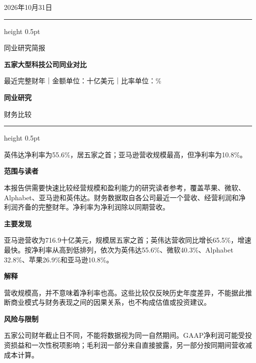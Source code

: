 \documentclass[a4paper,10pt]{article}
\newcommand{\ReportTitle}{五家大型科技公司同业对比}
\newcommand{\ReportType}{同业研究简报}
\newcommand{\ReportDate}{2026年10月31日}
\newcommand{\ReportScope}{最近完整财年｜金额单位：十亿美元｜比率单位：\%}
\newcommand{\TeamName}{同业研究}
\newcommand{\DeskName}{财务比较}
\newcommand{\KeyFinding}{英伟达净利率为55.6\%，居五家之首；亚马逊营收规模最高，但净利率为10.8\%。}
\begin{document}
\begin{minipage}[t]{0.70\textwidth}
\vspace{0pt}
{\small\ReportDate}\par\medskip
{\color{MemoBlue}\hrule height 0.5pt}\smallskip
{\large\ReportType}\par
{\LARGE\bfseries\ReportTitle}\par\medskip
\ReportScope
\end{minipage}\hfill
\begin{minipage}[t]{0.23\textwidth}
\vspace{0pt}\raggedleft
\colorbox{MemoBlue}{\parbox[c][19mm][c]{0.86\linewidth}{\centering\color{white}\bfseries\TeamName}}\par\medskip
\DeskName
\end{minipage}
\par\bigskip
{\color{MemoBlue}\hrule height 0.5pt}\medskip
{\large\KeyFinding}\par\bigskip

\begin{minipage}[t]{0.58\textwidth}
\vspace{0pt}\raggedright
\setlength{\parskip}{4pt}
\textbf{范围与读者}\par
本报告供需要快速比较经营规模和盈利能力的研究读者参考，覆盖苹果、微软、Alphabet、亚马逊和英伟达。财务数据取自各公司最近一个营收、经营利润和净利润齐备的完整财年。净利率为净利润除以同期营收。

\textbf{主要发现}\par
亚马逊营收为716.9十亿美元，规模居五家之首；英伟达营收同比增长65.5\%，增速最快。按净利率从高到低排列，依次为英伟达55.6\%、微软40.3\%、Alphabet 32.8\%、苹果26.9\%和亚马逊10.8\%。

\textbf{解释}\par
营收规模高，并不意味着净利率也高。这些比较仅反映历史年度差异，不能据此推断商业模式与财务表现之间的因果关系，也不构成估值或投资建议。

\textbf{风险与限制}\par
五家公司财年截止日不同，不能将数据视为同一自然期间。GAAP净利润可能受投资损益和一次性税项影响；毛利润一部分来自直接披露，另一部分按同期间营收减成本计算。
\end{minipage}\hfill
\begin{minipage}[t]{0.38\textwidth}
\vspace{0pt}\small

\end{minipage}
\par\medskip

\par\vfill
\end{document}
